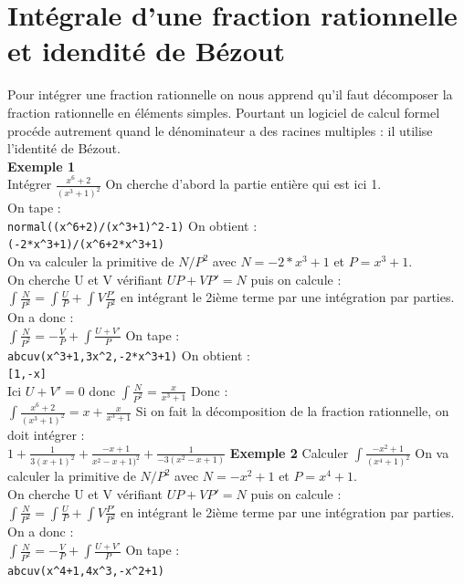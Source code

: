 \documentclass[a4paper,11pt]{book}
\begin{document}
\section{Int\'egrale d'une fraction rationnelle et idendit\'e de B\'ezout}
Pour int\'egrer une fraction rationnelle on nous apprend qu'il faut 
d\'ecomposer la fraction rationnelle en \'el\'ements simples. Pourtant un 
logiciel de calcul formel proc\'ede autrement quand le d\'enominateur a des 
racines multiples : il utilise l'identit\'e de B\'ezout.\\
{\bf Exemple 1}\\
Int\'egrer $\frac{x^6+2}{(x^3+1)^2}$
On cherche d'abord la partie enti\`ere qui est ici 1.\\
On tape :\\
{\tt normal((x\verb|^|6+2)/(x\verb|^|3+1)\verb|^|2-1)}
On obtient :\\
{\tt (-2*x\verb|^|3+1)/(x\verb|^|6+2*x\verb|^|3+1)}\\
On va calculer la primitive de $N/P^2$ avec $N=-2*x^3+1$ et $P=x^3+1$.\\
 On cherche U et V v\'erifiant $UP+VP'=N$ puis on calcule :\\
$\int\frac{N}{P^2}=\int\frac{U}{P}+\int V\frac{P'}{P^2}$ en int\'egrant le 2i\`eme terme par une int\'egration par parties. On a donc :\\
$\int\frac{N}{P^2}=-\frac{V}{P}+\int\frac{U+V'}{P}$
On tape :\\
{\tt abcuv(x\verb|^|3+1,3x\verb|^|2,-2*x\verb|^|3+1)}
On obtient :\\
{\tt [1,-x]}\\
Ici $U+V'=0$ donc $\int\frac{N}{P^2}=\frac{x}{x^3+1}$
Donc :\\
$\int\frac{x^6+2}{(x^3+1)^2}=x+\frac{x}{x^3+1}$
Si on fait la d\'ecomposition de la fraction rationnelle, on doit int\'egrer :\\
$1+\frac{1}{3(x+1)^2}+\frac{-x+1}{x^2-x+1)^2}+\frac{1}{-3(x^2-x+1)}$
{\bf Exemple 2}
Calculer $\int\frac{-x^2+1}{(x^4+1)^2}$
On va calculer la primitive de $N/P^2$ avec $N=-x^2+1$ et $P=x^4+1$.\\
 On cherche U et V v\'erifiant $UP+VP'=N$ puis on calcule :\\
$\int\frac{N}{P^2}=\int\frac{U}{P}+\int V\frac{P'}{P^2}$ en int\'egrant le 2i\`eme terme par une int\'egration par parties. On a donc :\\
$\int\frac{N}{P^2}=-\frac{V}{P}+\int\frac{U+V'}{P}$
On tape :\\
{\tt abcuv(x\verb|^|4+1,4x\verb|^|3,-x\verb|^|2+1)}
\end{document}
